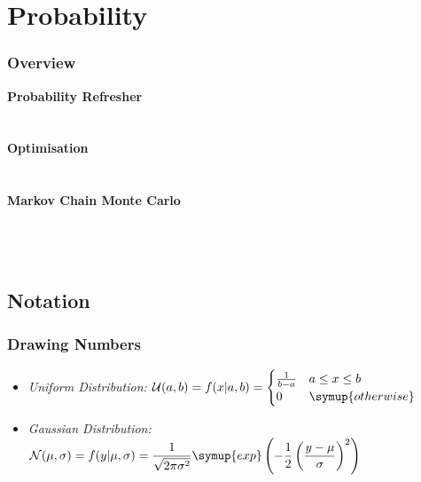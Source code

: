 	\section{Probability}

	\begin{frame}
		\frametitle{Overview}
		\bfseries{Probability Refresher}\\[1.5pt]
		\hspace*{3ex}\\
		\hspace*{3ex}\\[3.0pt]
		\bfseries{Optimisation}\\[1.5pt]
		\hspace*{3ex}\\
		\hspace*{3ex}\\[3.0pt]
		\bfseries{Markov Chain Monte Carlo}\\[1.5pt]
		\hspace*{3ex}\\
		\hspace*{3ex}\\
		\hspace*{3ex}\\[3.0pt]
	\end{frame}

	\subsection{Notation}

	\begin{frame}
		\frametitle{Drawing Numbers}
			\visible<2->{$$x \sim \mathcal{U}(a, b) \qquad\qquad y \sim \mathcal{N}(\mu, \sigma)$$\vspace{3ex}}
		\begin{itemize}
			\item<3-> \itshape{Uniform Distribution:} $\displaystyle{\mathcal{U}(a,b) = f(x|a,b) =
													   \begin{cases}
														   \frac{1}{b-a} & a\leq x\leq b \\
														   0 & \symup{otherwise}
													   \end{cases}}$
			\item<4-> \itshape{Gaussian Distribution:} $\displaystyle{\mathcal{N}(\mu,\sigma) = f(y|\mu,\sigma) =
														\frac{1}{\sqrt{2\pi \sigma^2}} \symup{exp}\left(-\frac{1}{2}
														\left(\frac{y - \mu}{\sigma}\right)^2\right)}$
		\end{itemize}
	\end{frame}

